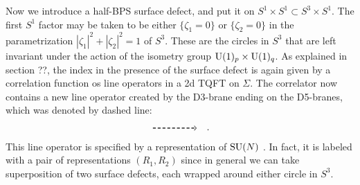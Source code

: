 Now we introduce a half-BPS surface defect, and put it on $S^{1} \times S^{1} \subset S^{3} \times S^{1}$.
The first $S^{1}$ factor may be taken to be either $\{\zeta_{1}=0\}$
or $\{\zeta_{2}=0\}$ in the parametrization $\left|\zeta_{1}\right|^{2}+\left|\zeta_{2}\right|^{2}=1$
of $S^{3}$. These are the circles in $S^{3}$ that are left invariant
under the action of the isometry group $\mathrm{U}(1)_{p} \times \mathrm{U}(1)_{q}$.
As explained in section ??, the index in the presence of the surface
defect is again given by a correlation function os line operators
in a 2d TQFT on $\Sigma$. The correlator now contains a new line
operator created by the D3-brane ending on the D5-branes, which was
denoted by dashed line: 
\begin{equation}
    \begin{tikzpicture}[scale=1, baseline=(x.base)]    \node (x) at (0,0) {\vphantom{x}};
        
        \draw[thick, densely dashed, ->] (0,0) -- (1.6,0);
        
    \end{tikzpicture}
  \quad .
\end{equation}
 This line operator is specified by a representation of $\mathrm{SU}(N)$ 
 \cite{Gukov:2006jk,Gukov:2008sn,Gadde:2013dda}. 
 In fact, it is labeled with a pair of representations
$(R_{1},R_{2})$ since in general we can take superposition of two
surface defects, each wrapped around either circle in $S^{3}$. 

